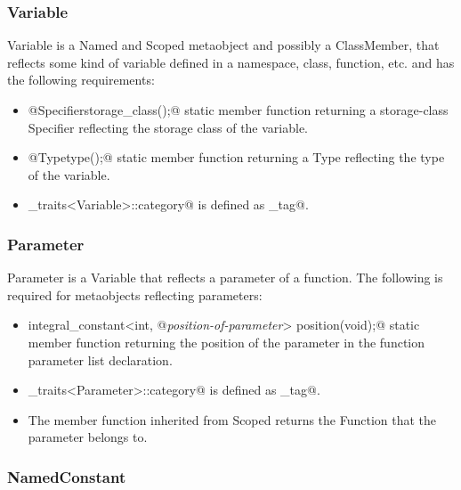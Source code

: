 \subsubsection{Variable}

{\metaobject Variable} is a {\metaobject Named} and {\metaobject Scoped} metaobject and possibly a
{\metaobject ClassMember}, that reflects some kind of variable defined in a namespace, class, function, etc.
and has the following requirements:

\begin{itemize}
	\item{\verb@static @{\metaobject Specifier}\verb@ storage_class();@} static member function returning
	a storage-class {\metaobject Specifier} reflecting the storage class of the variable.

	\item{\verb@static @{\metaobject Type}\verb@ type();@} static member function returning
	a {\metaobject Type} reflecting the type of the variable.

	\item \verb@metaobject_traits<Variable>::category@ is defined as \verb@variable_tag@.
\end{itemize}

\subsubsection{Parameter}

{\metaobject Parameter} is a {\metaobject Variable} that reflects a parameter of a function.
The following is required for metaobjects reflecting parameters:

\begin{itemize}
	\item{\verb@static integral_constant<int, @{\em position-of-parameter}\verb@> position(void);@}
	static member function returning the position of the parameter in the function parameter list
	declaration.

	\item \verb@metaobject_traits<Parameter>::category@ is defined as \verb@parameter_tag@.

	\item The \verb@scope@ member function inherited from {\metaobject Scoped} returns
	the {\metaobject Function} that the parameter belongs to.
\end{itemize}

\subsubsection{NamedConstant}

